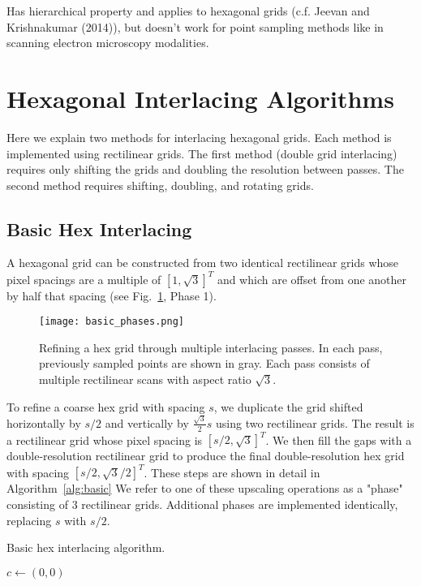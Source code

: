 \documentclass{article}
\begin{document}
Has hierarchical property and applies to hexagonal grids (c.f. Jeevan
and Krishnakumar (2014)), but doesn't work for point sampling methods
like in scanning electron microscopy modalities.


\section{Hexagonal Interlacing Algorithms}
\label{sec:hexinter}

Here we explain two methods for interlacing hexagonal grids.
%
Each method is implemented using rectilinear grids.
%
The first method (double grid interlacing) requires only shifting the grids and doubling the resolution between passes.
%
The second method requires shifting, doubling, and rotating grids.


\subsection{Basic Hex Interlacing}
\label{double-grid-interlacing}

A hexagonal grid can be constructed from two identical rectilinear grids
whose pixel spacings are a multiple of $[1, \sqrt{3}]^T$ and which are offset from one another by half that spacing (see Fig.~\ref{fig:basicphases}, Phase 1).

\begin{figure}[ht]
\centering
\texttt{[image: basic\_phases.png]}
\caption{
\label{fig:basicphases} Refining a hex grid through multiple interlacing passes.
%
In each pass, previously sampled points are shown in gray.
%
Each pass consists of multiple rectilinear scans with aspect ratio $\sqrt{3}$.
}
\end{figure}

To refine a coarse hex grid with spacing $s$, we duplicate the grid shifted horizontally by $s/2$ and vertically by $\frac{\sqrt{3}}{2} s$ using two rectilinear grids.
%
The result is a rectilinear grid whose pixel spacing is $[s/2, \sqrt{3}]^T$.
%
We then fill the gaps with a double-resolution rectilinear grid to produce the final double-resolution hex grid with spacing $[s/2, \sqrt{3}/2]^T$.
%
These steps are shown in detail in Algorithm~\ref{alg:basic}
%
We refer to one of these upscaling operations as a "phase" consisting of 3 rectilinear grids.
%
Additional phases are implemented identically, replacing $s$ with $s/2$.

\begin{algorithm}
\caption{Basic hex interlacing algorithm.}\label{alg:basic}
\begin{algorithmic}
	\State $c \gets (0, 0)$
\end{algorithmic}
\end{algorithm}
\end{document}
